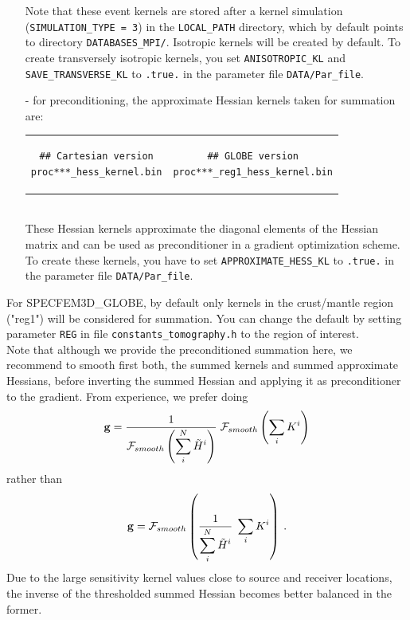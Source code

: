 \begin{itemize}
Note that these event kernels are stored after a kernel simulation (\texttt{SIMULATION\_TYPE = 3}) in the \texttt{LOCAL\_PATH} directory, which by default points to directory \texttt{DATABASES\_MPI/}. Isotropic kernels will be created by default. To create transversely isotropic kernels, you set \texttt{ANISOTROPIC\_KL} and \texttt{SAVE\_TRANSVERSE\_KL} to \texttt{.true.} in the parameter file \texttt{DATA/Par\_file}. \\

\item [- ] for preconditioning, the approximate Hessian kernels taken for summation are:\\
\begin{tabular}{ c c }
\begin{minipage}{3in}
\begin{verbatim}
## Cartesian version
proc***_hess_kernel.bin
\end{verbatim}
\end{minipage}
&
\begin{minipage}{3in}
\begin{verbatim}
## GLOBE version
proc***_reg1_hess_kernel.bin
\end{verbatim}
\end{minipage}
\end{tabular}\\

These Hessian kernels approximate the diagonal elements of the Hessian matrix and can be used as preconditioner in a gradient optimization scheme.
To create these kernels, you have to set \texttt{APPROXIMATE\_HESS\_KL} to \texttt{.true.} in the parameter file \texttt{DATA/Par\_file}.\\

\end{itemize}


For SPECFEM3D\_GLOBE, by default only kernels in the crust/mantle region ("reg1") will be considered for summation. You can change the default by setting parameter \texttt{REG} in file \texttt{constants\_tomography.h} to the region of interest. \\

Note that although we provide the preconditioned summation here, we recommend to smooth first both, the summed kernels and summed approximate Hessians, before inverting the summed Hessian and applying it as preconditioner to the gradient. From experience, we prefer doing
\begin{equation}
\mathbf{g} =  \frac{1}{\mathcal{F}_{smooth} \left( \displaystyle\sum^{N}_i \tilde{H}^{i} \right) }  \; \mathcal{F}_{smooth} \left( \displaystyle\sum_i K^{i}  \right) \nonumber
\end{equation}
rather than
\begin{equation}
\mathbf{g} = \mathcal{F}_{smooth} \left( \frac{1}{\displaystyle\sum^{N}_i \tilde{H}^{i}}  \;  \displaystyle\sum_i K^{i}  \right) \: . \nonumber
\end{equation}
Due to the large sensitivity kernel values close to source and receiver locations, the inverse of the thresholded summed Hessian becomes better balanced in the former.


